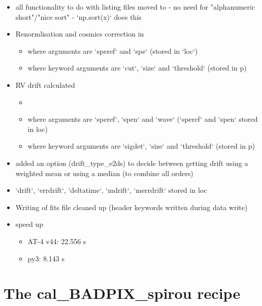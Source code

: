 \begin{itemize}
\item all functionality to do with listing files moved to  - no need for "alphanumeric short"/"nice sort" - `np.sort(x)` does this
    
\item Renormlisation and cosmics correction in 
	\begin{itemize}
	\item where arguments are `speref` and `spe` (stored in `loc`)
	\item where keyword arguments are `cut`, `size` and `threshold` (stored in p)
	\end{itemize}

\item RV drift calculated
	\begin{itemize}
	\item {}
	\item where arguments are `speref`, `spen` and `wave` (`speref` and `spen` stored in loc)
	\item where keyword arguments are `sigdet`, `size` and `threshold` (stored in p)
	\end{itemize}

\item added an option (drift\_type\_e2ds) to decide between getting drift using a weighted mean or using a median (to combine all orders)

\item `drift`, `errdrift`, `deltatime`, `mdrift`, `merrdrift` stored in loc

\item Writing of fits file cleaned up (header keywords written during data write)

\item speed up
	\begin{itemize}
	\item AT-4 v44: 22.556 s
	\item py3:  8.143 s
	\end{itemize}

\end{itemize}


\section{The cal\_BADPIX\_spirou recipe}
\label{ch:changelog:At4:cal_BADPIX_spirou}

